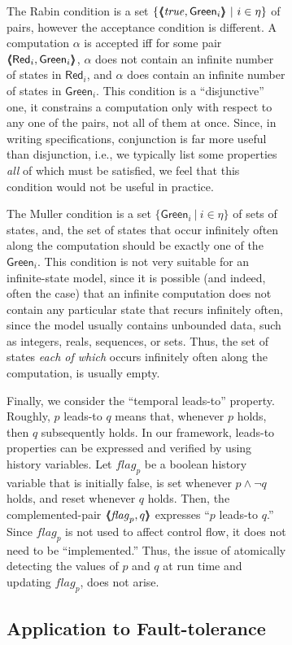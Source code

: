 \documentclass[11pt]{article}
\newcommand{\flag}{\mathit{flag}}
\newcommand{\GREEN}{\mathsf{Green}}
\newcommand{\RED}{\mathsf{Red}}
\newcommand{\pair}[2]{\lpb #1, #2 \rpb}
\newcommand{\lpb}{\langle \hspace{-0.34em} \langle \hspace{-0.34em} \langle}
\newcommand{\rpb}{\rangle \hspace{-0.34em} \rangle \hspace{-0.34em} \rangle}
\newcommand{\al}{\alpha}
\begin{document}
\begin{figure}[htb]
\begin{figure}[htb]
The Rabin condition is a set 
$\{ \pair{\true}{\GREEN_i} ~|~ i \in \eta \}$
of pairs, however the acceptance condition is different.
A computation $\al$ is accepted iff for some pair
$\pair{\RED_i}{\GREEN_i}$, 
$\al$ does not contain an infinite number of states in $\RED_i$, and
$\al$ does contain an infinite number of states in $\GREEN_i$.
This condition is a ``disjunctive'' one, it constrains a computation
only with respect to any one of the pairs, not all of them at once.
Since, in writing specifications, conjunction is far more useful than
disjunction, i.e., we typically list some properties \emph{all} of which
must be satisfied, we feel that this condition would not be useful in
practice.

The Muller condition is a set 
$\{ \GREEN_i ~|~ i \in \eta \}$
of sets of states, and, the set of states that
occur infinitely often along the computation should be exactly one of
the $\GREEN_i$. This condition is not very suitable for an
infinite-state model, since it is possible (and indeed, often the
case) that an infinite computation does not contain any particular state
that recurs infinitely often, since the model usually contains
unbounded data, such as integers, reals, sequences, or sets.
Thus, the set of states \emph{each of which} 
occurs infinitely often along the computation, is usually empty.



Finally, we consider the ``temporal leads-to'' property.  Roughly, $p$
leads-to $q$ means that, whenever $p$ holds, then $q$ subsequently 
holds. In our framework, leads-to properties can be expressed and
verified by using history variables. 
Let $\flag_p$ be a boolean history variable that is initially false,
is set whenever $p \land \neg q$ holds, and reset whenever $q$ holds.
Then, the complemented-pair $\pair{\flag_p}{q}$ expresses ``$p$ leads-to $q$.''
Since $\flag_p$ is not used to affect control flow, it
does not need to be ``implemented.'' Thus, the issue of
atomically detecting the values of $p$ and $q$ at run time and updating
$\flag_p$, does not arise.






\subsection{Application to Fault-tolerance}
\label{sec:fault-tolerance}


\end{figure}
\end{figure}
\end{document}
